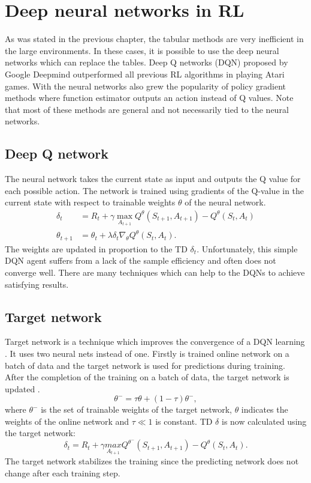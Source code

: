 \section{Deep neural networks in RL}
As was stated in the previous chapter, the tabular methods are very inefficient in the large environments. In these cases, it is possible to use the deep neural networks which can replace the tables. Deep Q networks (DQN) proposed by Google Deepmind \cite{mnih2015} outperformed all previous RL algorithms in playing Atari games. With the neural networks also grew the popularity of policy gradient methods where function estimator outputs an action instead of Q values. Note that most of these methods are general and not necessarily tied to the neural networks.

\subsection{Deep Q network}
The neural network takes the current state as input and outputs the Q value for each possible action. The network is trained using gradients of the Q-value in the current state with respect to trainable weights $\theta$ of the neural network.
\begin{align} \label{eq:qlearn}
\delta_t &= R_{t} + \gamma \underset{A_{t+1}}{\max}Q^\theta(S_{t+1}, A_{t+1}) - Q^\theta(S_t, A_t)\\
\theta_{t+1} &= \theta_t + \lambda \delta_t \nabla_\theta Q^\theta (S_t, A_t).
\end{align}
The weights are updated in proportion to the TD $\delta_t$. Unfortunately, this simple DQN agent suffers from a lack of the sample efficiency and often does not converge well. There are many techniques which can help to the DQNs to achieve satisfying results.

\subsection{Target network}
Target network is a technique which improves the convergence of a DQN learning \cite{mnih2015}. It uses two neural nets instead of one. Firstly is trained online network on a batch of data and the target network is used for predictions during training. After the completion of the training on a batch of data, the target network is updated \cite{lilicrap2015}.
\begin{equation}
\theta^- = \tau \theta + (1-\tau)\theta^-,
\end{equation}
where $\theta^-$ is the set of trainable weights of the target network, $\theta$ indicates the weights of the online network and $\tau \ll 1$ is constant.
TD $\delta$ is now calculated using the target network:
\begin{equation}
\delta_t = R_{t} + \gamma \underset{A_{t+1}}{max}Q^{\theta^-}(S_{t+1}, A_{t+1}) - Q^\theta(S_t, A_t). 
\end{equation}
The target network stabilizes the training since the predicting network does not change after each training step.

